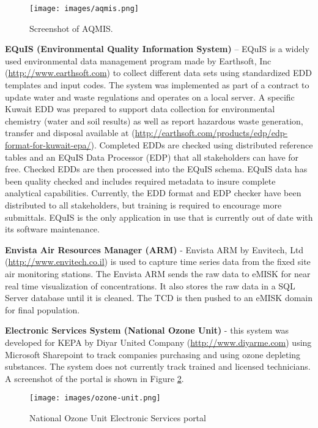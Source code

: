 %
\begin{figure}[H]
\centering
\texttt{[image: images/aqmis.png]} 
\caption{Screenshot of AQMIS.}
\label{fig:aqmis}
\end{figure}
%

\textbf{EQuIS (Environmental Quality Information System)} – EQuIS is a widely used environmental data management program made by Earthsoft, Inc (\url{http://www.earthsoft.com}) to collect different data sets using standardized EDD templates and input codes. The system was implemented as part of a contract to update water and waste regulations and operates on a local server. A specific Kuwait EDD was prepared to support data collection for environmental chemistry (water and soil results) as well as report hazardous waste generation, transfer and disposal available at (\url{http://earthsoft.com/products/edp/edp-format-for-kuwait-epa/}). Completed EDDs are checked using distributed reference tables and an EQuIS Data Processor (EDP) that all stakeholders can have for free. Checked EDDs are then processed into the EQuIS schema. EQuIS data has been quality checked and includes required metadata to insure complete analytical capabilities. Currently, the EDD format and EDP checker have been distributed to all stakeholders, but training is required to encourage more submittals. EQuIS is the only application in use that is currently out of date with its software maintenance.

\textbf{Envista Air Resources Manager (ARM)} - Envista ARM by Envitech, Ltd (\url{http://www.envitech.co.il}) is used to capture time series data from the fixed site air monitoring stations. The Envista ARM sends the raw data to eMISK for near real time visualization of concentrations. It also stores the raw data in a SQL Server database until it is cleaned. The TCD is then pushed to an eMISK domain for final population. 

\textbf{Electronic Services System (National Ozone Unit)} - this system was developed for KEPA by Diyar United Company (\url{http://www.diyarme.com}) using Microsoft Sharepoint to track companies purchasing and using ozone depleting substances. The system does not currently track trained and licensed technicians. A screenshot of the portal is shown in Figure \ref{fig:ozone-unit}.

%
\begin{figure}[H]
\centering
\texttt{[image: images/ozone-unit.png]} 
\caption{National Ozone Unit Electronic Services portal}
\label{fig:ozone-unit}
\end{figure}
%

